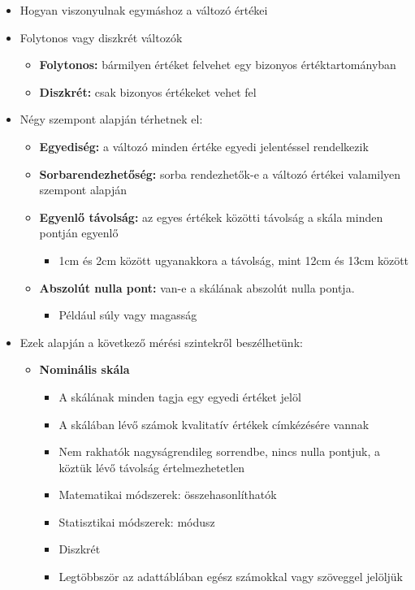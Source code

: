 \documentclass[
  letterpaper,
  DIV=11,
  numbers=noendperiod]{scrreprt}
\providecommand{\tightlist}{%
  \setlength{\itemsep}{0pt}\setlength{\parskip}{0pt}}\usepackage{longtable,booktabs,array}
\begin{document}
\begin{itemize}
\item
  Hogyan viszonyulnak egymáshoz a változó értékei
\item
  Folytonos vagy diszkrét változók

  \begin{itemize}
  \item
    \textbf{Folytonos:} bármilyen értéket felvehet egy bizonyos
    értéktartományban
  \item
    \textbf{Diszkrét:} csak bizonyos értékeket vehet fel
  \end{itemize}
\item
  Négy szempont alapján térhetnek el:

  \begin{itemize}
  \item
    \textbf{Egyediség:} a változó minden értéke egyedi jelentéssel
    rendelkezik
  \item
    \textbf{Sorbarendezhetőség:} sorba rendezhetők-e a változó értékei
    valamilyen szempont alapján
  \item
    \textbf{Egyenlő távolság:} az egyes értékek közötti távolság a skála
    minden pontján egyenlő

    \begin{itemize}
    \tightlist
    \item
      1cm és 2cm között ugyanakkora a távolság, mint 12cm és 13cm között
    \end{itemize}
  \item
    \textbf{Abszolút nulla pont:} van-e a skálának abszolút nulla
    pontja.

    \begin{itemize}
    \tightlist
    \item
      Például súly vagy magasság
    \end{itemize}
  \end{itemize}
\item
  Ezek alapján a következő mérési szintekről beszélhetünk:

  \begin{itemize}
  \item
    \textbf{Nominális skála}

    \begin{itemize}
    \item
      A skálának minden tagja egy egyedi értéket jelöl
    \item
      A skálában lévő számok kvalitatív értékek címkézésére vannak
    \item
      Nem rakhatók nagyságrendileg sorrendbe, nincs nulla pontjuk, a
      köztük lévő távolság értelmezhetetlen
    \item
      Matematikai módszerek: összehasonlíthatók
    \item
      Statisztikai módszerek: módusz
    \item
      Diszkrét
    \item
      Legtöbbször az adattáblában egész számokkal vagy szöveggel
      jelöljük


\end{itemize}
\end{itemize}
\end{itemize}
\end{document}
